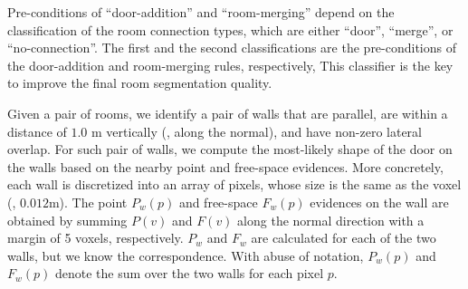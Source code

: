 






 Pre-conditions of
``door-addition'' and ``room-merging'' depend on the classification of
the room connection types, which are either ``door'', ``merge'', or
``no-connection''. The first and the second classifications are the
pre-conditions of the door-addition and room-merging rules, respectively,
This classifier is the key to improve the final room segmentation quality.

Given a pair of rooms, we identify a pair of walls that are parallel,
are within a distance of $1.0$ m vertically (\ie, along the normal), and
have non-zero lateral overlap. For such pair of walls, we compute the
most-likely shape of the door on the walls based on the nearby point and
free-space evidences. More concretely, each wall is discretized into an
array of pixels, whose size is the same as the voxel (\ie,
$0.012$m). The point $P_w(p)$ and free-space $F_w(p)$ evidences on the
wall are obtained by summing $P(v)$ and $F(v)$ along the normal
direction with a margin of 5 voxels, respectively. $P_w$ and $F_w$ are
calculated for each of the two walls, but we know the
correspondence. With abuse of notation, $P_w(p)$ and $F_w(p)$ denote the
sum over the two walls for each pixel $p$.

